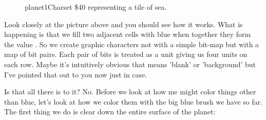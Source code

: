 \begin{figure}[H]
{\begin{adjustbox}{width=4cm,center}
    \end{adjustbox}
  }\caption{planet1Charset \$40 representing a tile of sea.}
\end{figure}

Look closely at the picture above and you should see how it works. What is happening is that we fill
two adjacent cells with blue when together they form the value . So
we create graphic characters not with a simple bit-map but with a map of bit pairs. Each pair of bits is treated as a
unit giving us four units on each row. Maybe it's intuitively obvious that 
means 'blank' or 'background' but I've pointed that out to you now just in case.

\lstset{style=6502Style}
%


Is that all there is to it? No. Before we look at how me might color things other than blue, let's look at how we color them
with the big blue brush we have so far. The first thing we do is clear down the entire surface of the planet:

